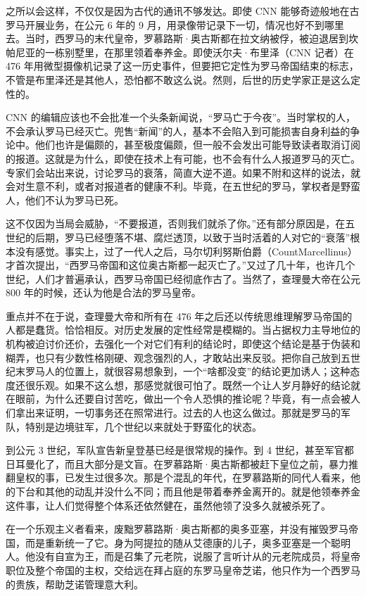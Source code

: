 之所以会这样，不仅仅是因为古代的通讯不够发达。即使 CNN 能够奇迹般地在古罗马开展业务，在公元 6 年的 9 月，用录像带记录下一切，情况也好不到哪里去。当时，西罗马的末代皇帝，罗慕路斯·奥古斯都在拉文纳被俘，被迫退居到坎帕尼亚的一栋别墅里，在那里领着奉养金。即使沃尔夫·布里泽（CNN 记者）在 476 年用微型摄像机记录了这一历史事件，但要把它定性为罗马帝国结束的标志，不管是布里泽还是其他人，恐怕都不敢这么说。然则，后世的历史学家正是这么定性的。

CNN 的编辑应该也不会批准一个头条新闻说，“罗马亡于今夜”。当时掌权的人，不会承认罗马已经灭亡。兜售“新闻”的人，基本不会陷入到可能损害自身利益的争论中。他们也许是偏颇的，甚至极度偏颇，但一般不会发出可能导致读者取消订阅的报道。这就是为什么，即使在技术上有可能，也不会有什么人报道罗马的灭亡。专家们会站出来说，讨论罗马的衰落，简直大逆不道。如果不附和这样的说法，就会对生意不利，或者对报道者的健康不利。毕竟，在五世纪的罗马，掌权者是野蛮人，他们不认为罗马已死。

这不仅因为当局会威胁，“不要报道，否则我们就杀了你。”还有部分原因是，在五世纪的后期，罗马已经堕落不堪、腐烂透顶，以致于当时活着的人对它的“衰落”根本没有感觉。事实上，过了一代人之后，马尔切利努斯伯爵（CountMarcellinus）才首次提出，“西罗马帝国和这位奥古斯都一起灭亡了。”又过了几十年，也许几个世纪，人们才普遍承认，西罗马帝国已经彻底作古了。当然了，查理曼大帝在公元 800 年的时候，还认为他是合法的罗马皇帝。

重点并不在于说，查理曼大帝和所有在 476 年之后还以传统思维理解罗马帝国的人都是蠢货。恰恰相反。对历史发展的定性经常是模糊的。当占据权力主导地位的机构被迫讨价还价，去强化一个对它们有利的结论时，即使这个结论是基于伪装和糊弄，也只有少数性格刚硬、观念强烈的人，才敢站出来反驳。把你自己放到五世纪末罗马人的位置上，就很容易想象到，一个“啥都没变”的结论更加诱人；这种态度还很乐观。如果不这么想，那感觉就很可怕了。既然一个让人岁月静好的结论就在眼前，为什么还要自讨苦吃，做出一个令人恐惧的推论呢？毕竟，有一点会被人们拿出来证明，一切事务还在照常进行。过去的人也这么做过。那就是罗马的军队，特别是边境驻军，几个世纪以来就处于野蛮化的状态。

到公元 3 世纪，军队宣告新皇登基已经是很常规的操作。到 4 世纪，甚至军官都日耳曼化了，而且大部分是文盲。在罗慕路斯·奥古斯都被赶下皇位之前，暴力推翻皇权的事，已发生过很多次。那是个混乱的年代，在罗慕路斯的同代人看来，他的下台和其他的动乱并没什么不同；而且他是带着奉养金离开的。就是他领奉养金这件事，让人们觉得整个体系还依然健在，虽然他领了没多久就被杀死了。

在一个乐观主义者看来，废黜罗慕路斯·奥古斯都的奥多亚塞，并没有摧毁罗马帝国，而是重新统一了它。身为阿提拉的随从艾德康的儿子，奥多亚塞是一个聪明人。他没有自宣为王，而是召集了元老院，说服了言听计从的元老院成员，将皇帝职位及整个帝国的主权，交给远在拜占庭的东罗马皇帝芝诺，他只作为一个西罗马的贵族，帮助芝诺管理意大利。

